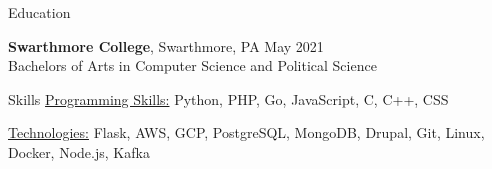 \documentclass{resume} %
\begin{document}
\begin{rSection}{Education}
	
	{\bf Swarthmore College}, Swarthmore, PA \hfill {May 2021} \\ 
	Bachelors of Arts in Computer Science and Political Science
	
\end{rSection}


\begin{rSection}{Skills}
	\underline{Programming Skills:} Python, PHP, Go, JavaScript, C, C++, CSS
	
	\underline{Technologies:} Flask, AWS, GCP, PostgreSQL, MongoDB, Drupal, Git, Linux, Docker, Node.js, Kafka
\end{rSection}
\end{document}

